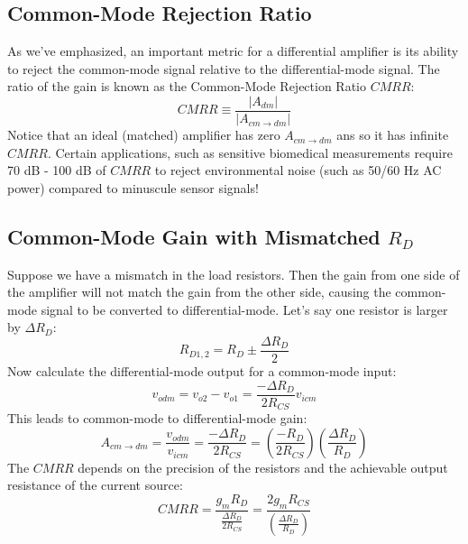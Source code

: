 \subsection{Common-Mode Rejection Ratio}
As we've emphasized, an important metric for a differential amplifier is its ability to reject the common-mode signal relative to the differential-mode signal.  The ratio of the gain is known as the Common-Mode Rejection Ratio $CMRR$:
    \begin{equation} 
        CMRR \equiv \frac{{\left| {{A_{dm}}} \right|}}{{\left| {{A_{cm \to dm}}} \right|}}
    \end{equation}
Notice that an ideal (matched) amplifier has zero $A_{cm \to dm}$ ans so it has infinite $CMRR$. Certain applications, such as sensitive biomedical measurements require 70 dB - 100 dB of $CMRR$ to reject environmental noise (such as 50/60 Hz AC power) compared to minuscule sensor signals!
\subsection{Common-Mode Gain with Mismatched \texorpdfstring{$R_D$}{Load Resistance}}
Suppose we have a mismatch in the load resistors.  Then the gain from one side of the amplifier will not match the gain from the other side, causing the common-mode signal to be converted to differential-mode.  Let's say one resistor is larger by $\Delta R_{D}$:
    \begin{equation} 
        {R_{D1,2}} = {R_D} \pm \frac{\Delta {R_D}}{2}
    \end{equation}
Now calculate the differential-mode output for a common-mode input:
    \begin{equation}
        {v_{odm}} = {v_{o2}} - {v_{o1}} = \frac{{ - \Delta {R_D}}}{{2{R_{CS}}}}{v_{icm}}
    \end{equation}
This leads to common-mode to differential-mode gain:
    \begin{equation} 
        {A_{cm\to dm}} = \frac{{{v_{odm}}}}{{{v_{icm}}}} = \frac{{ - \Delta {R_D}}}{{2{R_{CS}}}} = \left( {\frac{{ - {R_D}}}{{2{R_{CS}}}}} \right)\left( {\frac{{\Delta {R_D}}}{{{R_D}}}} \right)
    \end{equation}
The $CMRR$  depends on the precision of the resistors and the achievable output resistance of the current source:
    \begin{equation} 
        CMRR  = \frac{{{g_m}{R_D}}}{{\frac{{\Delta {R_D}}}{{2{R_{CS}}}}}} = \frac{{2{g_m}{R_{CS}}}}{{\left( {\frac{{\Delta {R_D}}}{{{R_D}}}} \right)}}
    \end{equation}
